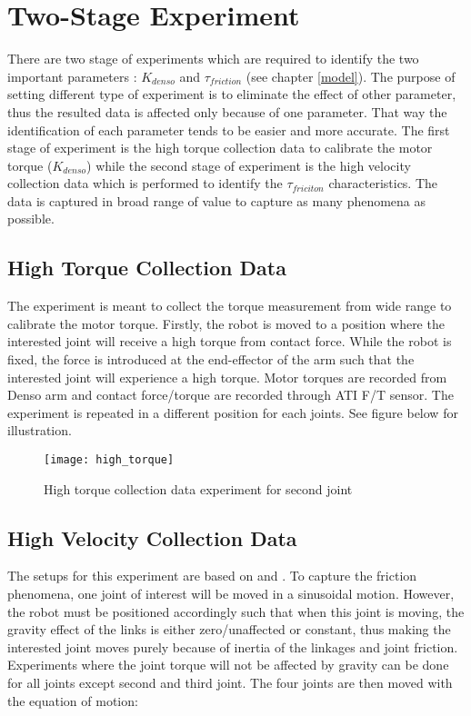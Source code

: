 \section{Two-Stage Experiment}
\label{two-stage experiment}
There are two stage of experiments which are required to identify the two important parameters : $K_{denso}$ and $\tau_{friction}$ (see chapter \ref{model}). The purpose of setting different type of experiment is to eliminate the effect of other parameter, thus the resulted data is affected only because of one parameter. That way the identification of each parameter tends to be easier and more accurate. The first stage of experiment is the high torque collection data to calibrate the motor torque ($K_{denso}$) while the second stage of experiment is the high velocity collection data which is performed to identify the $\tau_{friciton}$ characteristics. The data is captured in broad range of value to capture as many phenomena as possible.


\subsection{High Torque Collection Data}
\label{push exp}

The experiment is meant to collect the torque measurement from wide range to calibrate the motor torque. Firstly, the robot is moved to a position where the interested joint will receive a high torque from contact force. While the robot is fixed, the force is introduced at the end-effector of the arm such that the interested joint will experience a high torque. Motor torques are recorded from Denso arm and contact force/torque are recorded through ATI F/T sensor. The experiment is repeated in a different position for each joints. See figure below for illustration.

\begin{figure}[H]
    \centering
    \texttt{[image: high\_torque]}
    \caption{High torque collection data experiment for second joint}
\end{figure}


\subsection{High Velocity Collection Data}
\label{fric exp}
The setups for this experiment are based on \cite{Nori15} and \cite{Ngoc09}. To capture the friction phenomena, one joint of interest will be moved in a sinusoidal motion. However, the robot must be positioned accordingly such that when this joint is moving, the gravity effect of the links is either zero/unaffected or constant, thus making the interested joint moves purely because of inertia of the linkages and joint friction. Experiments where the joint torque will not be affected by gravity can be done for all joints except second and third joint. The four joints are then moved with the equation of motion:

